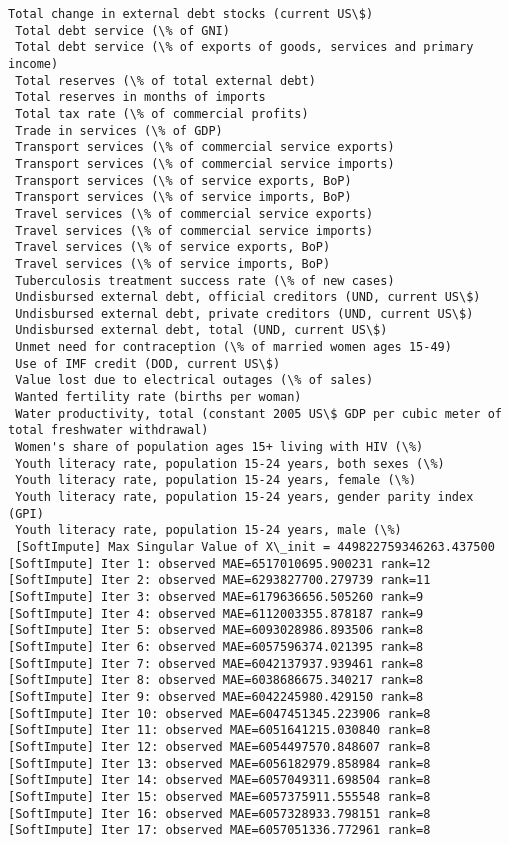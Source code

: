 \documentclass[11pt]{article}
\begin{document}
\begin{Verbatim}[commandchars=\\\{\}]
 Total change in external debt stocks (current US\$)
 Total debt service (\% of GNI)
 Total debt service (\% of exports of goods, services and primary income)
 Total reserves (\% of total external debt)
 Total reserves in months of imports
 Total tax rate (\% of commercial profits)
 Trade in services (\% of GDP)
 Transport services (\% of commercial service exports)
 Transport services (\% of commercial service imports)
 Transport services (\% of service exports, BoP)
 Transport services (\% of service imports, BoP)
 Travel services (\% of commercial service exports)
 Travel services (\% of commercial service imports)
 Travel services (\% of service exports, BoP)
 Travel services (\% of service imports, BoP)
 Tuberculosis treatment success rate (\% of new cases)
 Undisbursed external debt, official creditors (UND, current US\$)
 Undisbursed external debt, private creditors (UND, current US\$)
 Undisbursed external debt, total (UND, current US\$)
 Unmet need for contraception (\% of married women ages 15-49)
 Use of IMF credit (DOD, current US\$)
 Value lost due to electrical outages (\% of sales)
 Wanted fertility rate (births per woman)
 Water productivity, total (constant 2005 US\$ GDP per cubic meter of total freshwater withdrawal)
 Women's share of population ages 15+ living with HIV (\%)
 Youth literacy rate, population 15-24 years, both sexes (\%)
 Youth literacy rate, population 15-24 years, female (\%)
 Youth literacy rate, population 15-24 years, gender parity index (GPI)
 Youth literacy rate, population 15-24 years, male (\%)
 [SoftImpute] Max Singular Value of X\_init = 449822759346263.437500
[SoftImpute] Iter 1: observed MAE=6517010695.900231 rank=12
[SoftImpute] Iter 2: observed MAE=6293827700.279739 rank=11
[SoftImpute] Iter 3: observed MAE=6179636656.505260 rank=9
[SoftImpute] Iter 4: observed MAE=6112003355.878187 rank=9
[SoftImpute] Iter 5: observed MAE=6093028986.893506 rank=8
[SoftImpute] Iter 6: observed MAE=6057596374.021395 rank=8
[SoftImpute] Iter 7: observed MAE=6042137937.939461 rank=8
[SoftImpute] Iter 8: observed MAE=6038686675.340217 rank=8
[SoftImpute] Iter 9: observed MAE=6042245980.429150 rank=8
[SoftImpute] Iter 10: observed MAE=6047451345.223906 rank=8
[SoftImpute] Iter 11: observed MAE=6051641215.030840 rank=8
[SoftImpute] Iter 12: observed MAE=6054497570.848607 rank=8
[SoftImpute] Iter 13: observed MAE=6056182979.858984 rank=8
[SoftImpute] Iter 14: observed MAE=6057049311.698504 rank=8
[SoftImpute] Iter 15: observed MAE=6057375911.555548 rank=8
[SoftImpute] Iter 16: observed MAE=6057328933.798151 rank=8
[SoftImpute] Iter 17: observed MAE=6057051336.772961 rank=8

\end{Verbatim}
\end{document}
